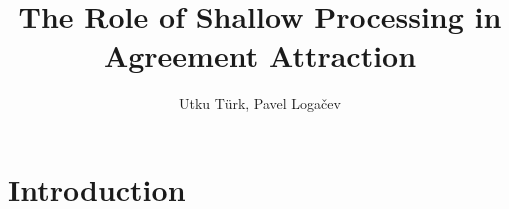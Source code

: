 \documentclass[doc,a4paper,man,natbib,floatsintext,noextraspace]{apa6}\usepackage[]{graphicx}\usepackage[]{color}
\title{The Role of Shallow Processing in Agreement Attraction}
\author{Utku Türk, Pavel Loga\v{c}ev}
\affiliation{Boğaziçi University}
\begin{document}
\maketitle


\section{Introduction} \label{sec:Intro}

% 
% 
% 
% 
% 
% 


\end{document}
